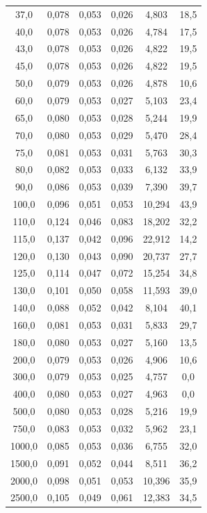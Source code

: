 \documentclass[a4paper, czech]{article}
\begin{document}
\begin{table}[H]
\begin{tabular}{cccccc}
37,0    & 0,078 & 0,053 & 0,026 & 4,803  & 18,5 \\
40,0    & 0,078 & 0,053 & 0,026 & 4,784  & 17,5 \\
43,0    & 0,078 & 0,053 & 0,026 & 4,822  & 19,5 \\
45,0    & 0,078 & 0,053 & 0,026 & 4,822  & 19,5 \\
50,0    & 0,079 & 0,053 & 0,026 & 4,878  & 10,6 \\
60,0    & 0,079 & 0,053 & 0,027 & 5,103  & 23,4 \\
65,0    & 0,080 & 0,053 & 0,028 & 5,244  & 19,9 \\
70,0    & 0,080 & 0,053 & 0,029 & 5,470  & 28,4 \\
75,0    & 0,081 & 0,053 & 0,031 & 5,763  & 30,3 \\
80,0    & 0,082 & 0,053 & 0,033 & 6,132  & 33,9 \\
90,0    & 0,086 & 0,053 & 0,039 & 7,390  & 39,7 \\
100,0   & 0,096 & 0,051 & 0,053 & 10,294 & 43,9 \\
110,0   & 0,124 & 0,046 & 0,083 & 18,202 & 32,2 \\
115,0   & 0,137 & 0,042 & 0,096 & 22,912 & 14,2 \\
120,0   & 0,130 & 0,043 & 0,090 & 20,737 & 27,7 \\
125,0   & 0,114 & 0,047 & 0,072 & 15,254 & 34,8 \\
130,0   & 0,101 & 0,050 & 0,058 & 11,593 & 39,0 \\
140,0   & 0,088 & 0,052 & 0,042 & 8,104  & 40,1 \\
160,0   & 0,081 & 0,053 & 0,031 & 5,833  & 29,7 \\
180,0   & 0,080 & 0,053 & 0,027 & 5,160  & 13,5 \\
200,0   & 0,079 & 0,053 & 0,026 & 4,906  & 10,6 \\
300,0   & 0,079 & 0,053 & 0,025 & 4,757  & 0,0  \\
400,0   & 0,080 & 0,053 & 0,027 & 4,963  & 0,0  \\
500,0   & 0,080 & 0,053 & 0,028 & 5,216  & 19,9 \\
750,0   & 0,083 & 0,053 & 0,032 & 5,962  & 23,1 \\
1000,0  & 0,085 & 0,053 & 0,036 & 6,755  & 32,0 \\
1500,0  & 0,091 & 0,052 & 0,044 & 8,511  & 36,2 \\
2000,0  & 0,098 & 0,051 & 0,053 & 10,396 & 35,9 \\
2500,0  & 0,105 & 0,049 & 0,061 & 12,383 & 34,5 \\

\end{tabular}
\end{table}
\end{document}
